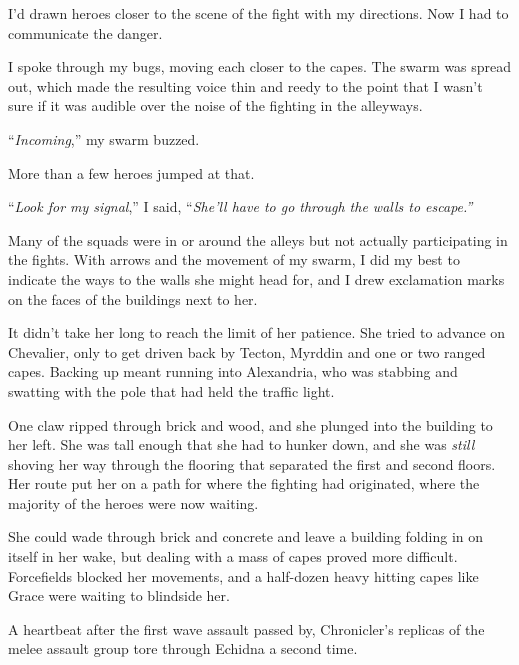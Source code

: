 I'd drawn heroes closer to the scene of the fight with my directions.  Now I had to communicate the danger.



I spoke through my bugs, moving each closer to the capes.  The swarm was spread out, which made the resulting voice thin and reedy to the point that I wasn't sure if it was audible over the noise of the fighting in the alleyways.



``\emph{Incoming},'' my swarm buzzed.



More than a few heroes jumped at that.



``\emph{Look for my signal},'' I said, ``\emph{She'll have to go through the walls to escape.''}



Many of the squads were in or around the alleys but not actually participating in the fights.  With arrows and the movement of my swarm, I did my best to indicate the ways to the walls she might head for, and I drew exclamation marks on the faces of the buildings next to her.



It didn't take her long to reach the limit of her patience.  She tried to advance on Chevalier, only to get driven back by Tecton, Myrddin and one or two ranged capes.  Backing up meant running into Alexandria, who was stabbing and swatting with the pole that had held the traffic light.



One claw ripped through brick and wood, and she plunged into the building to her left.  She was tall enough that she had to hunker down, and she was \emph{still} shoving her way through the flooring that separated the first and second floors.  Her route put her on a path for where the fighting had originated, where the majority of the heroes were now waiting.



She could wade through brick and concrete and leave a building folding in on itself in her wake, but dealing with a mass of capes proved more difficult.  Forcefields blocked her movements, and a half-dozen heavy hitting capes like Grace were waiting to blindside her.



A heartbeat after the first wave assault passed by, Chronicler's replicas of the melee assault group tore through Echidna a second time.




